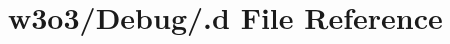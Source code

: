\hypertarget{w3o3_2_debug_2_8d}{}\section{w3o3/\+Debug/.d File Reference}
\label{w3o3_2_debug_2_8d}
